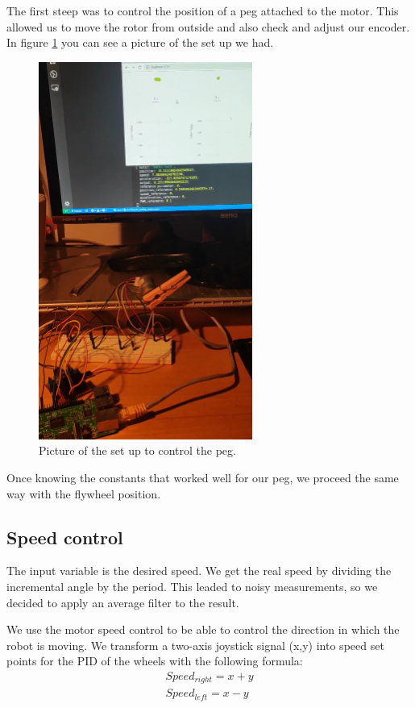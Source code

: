 The first steep was to control the position of a peg attached to the motor.
This allowed us to move the rotor from outside and also check and adjust our encoder.
In figure \ref{fig: control peg} you can see a picture of the set up we had.

\begin{figure}[H]
    \centering
    \includegraphics[width=7cm]{img/peg.png}
    \caption{Picture of the set up to control the peg.}
    \label{fig: control peg}
\end{figure}

Once knowing the constants that worked well for our peg,
we proceed the same way with the flywheel position.


\subsection{Speed control}
The input variable is the desired speed. We get the real speed by dividing the incremental angle
by the period. This leaded to noisy measurements, so we decided to apply an average filter to
the result.

We use the motor speed control to be able to control the direction in which the robot is moving.
We transform a two-axis joystick signal (x,y) into speed set points for the PID of the wheels
 with the following formula:
\begin{equation}
    \begin{split}
    Speed_{right} = x + y \\
    Speed_{left} = x - y    
    \end{split}
\end{equation}


